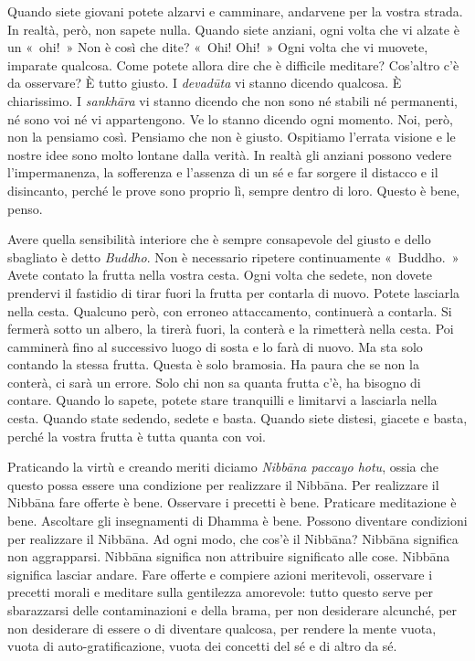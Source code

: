 Quando siete giovani potete alzarvi e camminare, andarvene per la vostra
strada. In realtà, però, non sapete nulla. Quando siete anziani, ogni
volta che vi alzate è un «~ohi!~» Non è così che dite? «~Ohi! Ohi!~»
Ogni volta che vi muovete, imparate qualcosa. Come potete allora dire
che è difficile meditare? Cos'altro c'è da osservare? È tutto giusto. I
\emph{devadūta} vi stanno dicendo qualcosa. È chiarissimo. I
\emph{sankhāra} vi stanno dicendo che non sono né stabili né permanenti,
né sono voi né vi appartengono. Ve lo stanno dicendo ogni momento. Noi,
però, non la pensiamo così. Pensiamo che non è giusto. Ospitiamo
l'errata visione e le nostre idee sono molto lontane dalla verità. In
realtà gli anziani possono vedere l'impermanenza, la sofferenza e
l'assenza di un sé e far sorgere il distacco e il disincanto, perché le
prove sono proprio lì, sempre dentro di loro. Questo è bene, penso.

Avere quella sensibilità interiore che è sempre consapevole del giusto e
dello sbagliato è detto \emph{Buddho}. Non è necessario ripetere
continuamente «~Buddho.~» Avete contato la frutta nella vostra cesta.
Ogni volta che sedete, non dovete prendervi il fastidio di tirar fuori
la frutta per contarla di nuovo. Potete lasciarla nella cesta. Qualcuno
però, con erroneo attaccamento, continuerà a contarla. Si fermerà sotto
un albero, la tirerà fuori, la conterà e la rimetterà nella cesta. Poi
camminerà fino al successivo luogo di sosta e lo farà di nuovo. Ma sta
solo contando la stessa frutta. Questa è solo bramosia. Ha paura che se
non la conterà, ci sarà un errore. Solo chi non sa quanta frutta c'è, ha
bisogno di contare. Quando lo sapete, potete stare tranquilli e
limitarvi a lasciarla nella cesta. Quando state sedendo, sedete e basta.
Quando siete distesi, giacete e basta, perché la vostra frutta è tutta
quanta con voi.

Praticando la virtù e creando meriti diciamo \emph{Nibbāna paccayo
hotu}, ossia che questo possa essere una condizione per realizzare il
Nibbāna. Per realizzare il Nibbāna fare offerte è bene.
Osservare i precetti è bene. Praticare meditazione è bene. Ascoltare gli
insegnamenti di Dhamma è bene. Possono diventare condizioni per
realizzare il Nibbāna. Ad ogni modo, che cos'è il Nibbāna?
Nibbāna significa non aggrapparsi. Nibbāna significa non
attribuire significato alle cose. Nibbāna significa lasciar
andare. Fare offerte e compiere azioni meritevoli, osservare i precetti
morali e meditare sulla gentilezza amorevole: tutto questo serve per
sbarazzarsi delle contaminazioni e della brama, per non desiderare
alcunché, per non desiderare di essere o di diventare qualcosa, per
rendere la mente vuota, vuota di auto-gratificazione, vuota dei concetti
del sé e di altro da sé.

